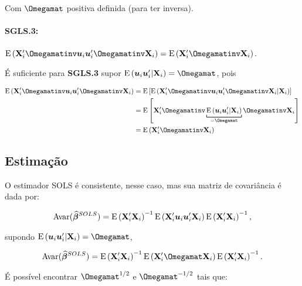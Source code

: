 \documentclass[11pt, oneside, a4paper, article]{article}
\numberwithin{equation}{section}
\begin{document}
\begin{description}
\noindent
Com $\Omegamat$ positiva definida (para ter inversa).

\paragraph{SGLS.3:}
$\E\left( \Xmat_{i}' \Omegamatinv \uvec_{i} \uvec_{i}' \Omegamatinv \Xmat_{i} \right) = \E\left( \Xmat_{i}' \Omegamatinv \Xmat_{i} \right)$.

\noindent
É suficiente para \textbf{SGLS.3} supor 
$\E\left( \uvec_{i} \uvec_{i}' | \Xmat_{i} \right) = \Omegamat$,
pois

\vspace{-1 em}
\begin{align*}
\E\left( \Xmat_{i}' \Omegamatinv \uvec_{i} \uvec_{i}' \Omegamatinv \Xmat_{i} \right) &=
\E\left[ 
\E\left( \Xmat_{i}' \Omegamatinv \uvec_{i} \uvec_{i}' \Omegamatinv \Xmat_{i} | \Xmat_{i} \right)
\right]
\\ &=
\E\left[ 
\Xmat_{i}' \Omegamatinv
\underbracket[.75 pt]{\E\left(  \uvec_{i} \uvec_{i}'  | \Xmat_{i} \right)}_{=\Omegamat}
\Omegamatinv \Xmat_{i}
\right]
\\ &=
\E\left( \Xmat_{i}' \Omegamatinv \Xmat_{i} \right)
\end{align*}

\subsection{Estimação}
O estimador SOLS é consistente, nesse caso, mas sua matriz de covariância é dada por:

\vspace{-1 em}
\begin{align*}
	\text{Avar}(\widehat{\boldsymbol{\beta}}^{SOLS}) = 
	\text{E}\left( \mathbf{X}_{i}' \mathbf{X}_{i} \right)^{-1}
	\text{E}\left( \mathbf{X}_{i}' \boldsymbol{u}_{i} \boldsymbol{u}_{i}' \mathbf{X}_{i} \right)
	\text{E}\left( \mathbf{X}_{i}' \mathbf{X}_{i} \right)^{-1},
\end{align*}

\noindent
supondo $\E\left( \uvec_{i} \uvec_{i}' | \Xmat_{i} \right) = \Omegamat$,

\vspace{-1 em}
\begin{align*}
	\Avar(\betavechat^{SOLS}) = 
	\E\left( \Xmat_{i}' \Xmat_{i} \right)^{-1}
	\E\left( \Xmat_{i}' \Omegamat \Xmat_{i} \right)
	\E\left( \Xmat_{i}' \Xmat_{i} \right)^{-1}.
\end{align*}

É possível encontrar $\Omegamat^{1/2}$ e $\Omegamat^{-1/2}$ tais que:


\end{description}
\end{document}
